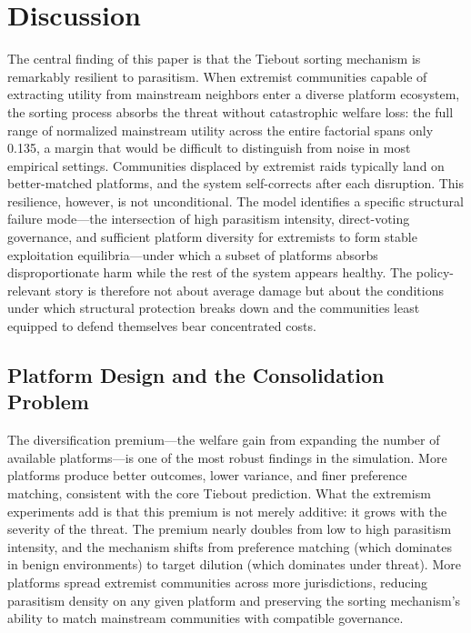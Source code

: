 \section{Discussion}
\label{sec:discussion}

The central finding of this paper is that the Tiebout sorting mechanism is remarkably resilient to parasitism. When extremist communities capable of extracting utility from mainstream neighbors enter a diverse platform ecosystem, the sorting process absorbs the threat without catastrophic welfare loss: the full range of normalized mainstream utility across the entire factorial spans only 0.135, a margin that would be difficult to distinguish from noise in most empirical settings. Communities displaced by extremist raids typically land on better-matched platforms, and the system self-corrects after each disruption. This resilience, however, is not unconditional. The model identifies a specific structural failure mode---the intersection of high parasitism intensity, direct-voting governance, and sufficient platform diversity for extremists to form stable exploitation equilibria---under which a subset of platforms absorbs disproportionate harm while the rest of the system appears healthy. The policy-relevant story is therefore not about average damage but about the conditions under which structural protection breaks down and the communities least equipped to defend themselves bear concentrated costs.

\subsection{Platform Design and the Consolidation Problem}

The diversification premium---the welfare gain from expanding the number of available platforms---is one of the most robust findings in the simulation. More platforms produce better outcomes, lower variance, and finer preference matching, consistent with the core Tiebout prediction. What the extremism experiments add is that this premium is not merely additive: it grows with the severity of the threat. The premium nearly doubles from low to high parasitism intensity, and the mechanism shifts from preference matching (which dominates in benign environments) to target dilution (which dominates under threat). More platforms spread extremist communities across more jurisdictions, reducing parasitism density on any given platform and preserving the sorting mechanism's ability to match mainstream communities with compatible governance.

